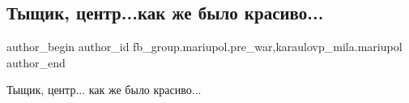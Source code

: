  
 
 
 
 

\subsection{Тыщик, центр...как же было красиво...}
\label{sec:02_02_2023.fb.fb_group.mariupol.pre_war.1.tishchik__tsentr_kak}
 
\ifcmt
 author_begin
   author_id fb_group.mariupol.pre_war,karaulovp_mila.mariupol
 author_end
\fi

Тыщик, центр... как же было красиво...
